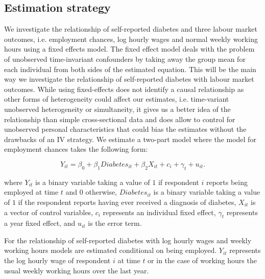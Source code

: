 \subsection{\noindent \label{sec:Estimation_Strategy}Estimation strategy}

We investigate the relationship of self-reported diabetes and three labour
market outcomes, i.e. employment chances, log hourly wages  and normal
weekly working hours using a fixed effects model. The fixed effect model deals with the problem of unobserved time-invariant
confounders by taking away the group mean for each individual from
both sides of the estimated equation. This will be the main way we investigate the relationship of self-reported
diabetes with labour market outcomes. While using fixed-effects
does not identify a causal relationship as other forms of heterogeneity
could affect our estimates, i.e. time-variant unobserved heterogeneity
or simultaneity, it gives us a better idea of the relationship than
simple cross-sectional data and does allow to control for unobserved
personal characteristics that could bias the estimates without the
drawbacks of an \ac{IV} strategy. We estimate a two-part model where
the model for employment chances takes the following form:

\noindent 
\begin{equation}
Y_{it}=\beta_{0}+\beta_{1}Diabetes_{it}+\beta_{2}X_{it}+c_{i}+\gamma_{t}+u_{it}.\label{eq:employed}
\end{equation}


where $Y_{it}$ is a binary variable taking a value of $1$ if respondent
$i$ reports being employed at time $t$ and $0$ otherwise, $Diabetes_{it}$
is a binary variable taking a value of $1$ if the respondent reports
having ever received a diagnosis of diabetes, $X_{it}$ is a vector
of control variables, $c_{i}$ represents an individual fixed effect,
$\gamma_{t}$ represents a year fixed effect, and $u_{it}$ is the
error term.

For the relationship of self-reported diabetes with log hourly wages
and weekly working hours models are estimated conditional on being
employed. $Y_{it}$ represents the log hourly wage of respondent $i$ at time
$t$ or in the case of working hours the usual weekly working hours
over the last year. 

